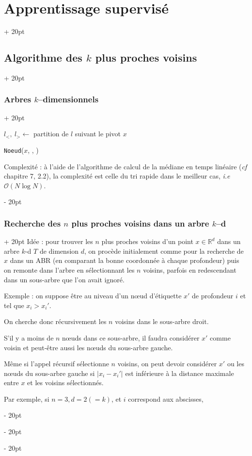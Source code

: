 \documentclass[a4paper, 12pt, twoside]{article}
\newenvironment{indalgo}[2][H]{
    \begin{algoBox}
        \begin{algorithm}[#1]
            \caption{#2}
}
{
        \end{algorithm}
    \end{algoBox}
}
\newcommand{\R}{\mathbb{R}} %
\newcommand{\abs}[1]{\left\lvert #1 \right\rvert}
\newcommand{\ind}[1][20pt]{\advance\leftskip + #1}
\newcommand{\deind}[1][20pt]{\advance\leftskip - #1}
\newenvironment{indt}[2][20pt]{#2 \par \ind[#1]}{\par \deind} %
\begin{document}
\begin{indt}{\section{Apprentissage supervisé}}
\begin{indt}{\subsection{Algorithme des $k$ plus proches voisins}}
\begin{indt}{\subsubsection{Arbres $k$--dimensionnels}}
\begin{indalgo}{Création de l'arbre $k$--d}
{{                            $l_<,\ l_> \gets$ partition de $l$ suivant le pivot $x$\;

                            \Return \texttt{Noeud}($x$, , )\;
                        }
                    }
                \end{indalgo}

                Complexité : à l'aide de l'algorithme de calcul de la médiane en temps linéaire (\textit{cf} chapitre 7, 2.2), la complexité est celle du tri rapide dans le meilleur cas, \textit{i.e} $\mathcal O(N\log N)$.
            \end{indt}

            \vspace{12pt}
            
            \begin{indt}{\subsubsection{Recherche des $n$ plus proches voisins dans un arbre $k$--d}}
                Idée : pour trouver les $n$ plus proches voisins d'un point $x \in \R^d$ dans un arbre $k$-d $T$ de dimension $d$, on procède initialement comme pour la recherche de $x$ dans un ABR (en comparant la bonne coordonnée à chaque profondeur) puis on remonte dans l'arbre en sélectionnant les $n$ voisins, parfois en redescendant dans un sous-arbre que l'on avait ignoré.

                Exemple : on suppose être au niveau d'un n\oe ud d'étiquette $x'$ de profondeur $i$ et tel que $x_i > x_i'$.

                On cherche donc récursivement les $n$ voisins dans le sous-arbre droit.

                S'il y a moins de $n$ n\oe uds dans ce sous-arbre, il faudra considérer $x'$ comme voisin et peut-être aussi les n\oe uds du sous-arbre gauche.

                Même si l'appel récursif sélectionne $n$ voisins, on peut devoir considérer $x'$ ou les n\oe uds du sous-arbre gauche si $\abs{x_i - x_i'}$ est inférieure à la distance maximale entre $x$ et les voisins sélectionnés.

                Par exemple, si $n = 3, d = 2 (= k)$, et $i$ correspond aux abscisses,

                \begin{center}
\end{center}
\end{indt}
\end{indt}
\end{indt}
\end{document}
